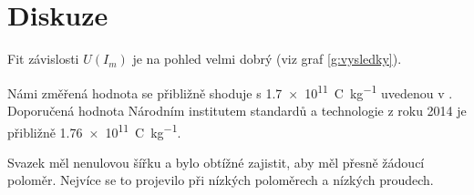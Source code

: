 \section*{Diskuze}
Fit závislosti $U(I_m)$ je na pohled velmi dobrý (viz graf \ref{g:vysledky}).

Námi změřená hodnota se přibližně shoduje s \SI{1.7e11}{\coulomb\per\kg} uvedenou v \cite{skripta}. Doporučená hodnota Národním institutem standardů a technologie z roku 2014 je přibližně \SI{1.76e11}{\coulomb\per\kg}.

Svazek měl nenulovou šířku a bylo obtížné zajistit, aby měl přesně žádoucí poloměr. Nejvíce se to projevilo při nízkých poloměrech a nízkých proudech. 